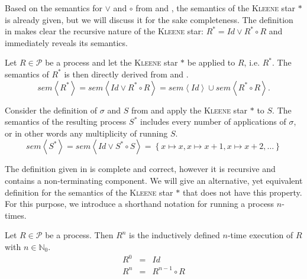 Based on the semantics for $\vee$ and $\circ$ from  and , the semantics of the \textsc{Kleene} star $*$ is already given, but we will discuss it for the sake completeness. The definition in  makes clear the recursive nature of the \textsc{Kleene} star: $R^* = Id \vee R^* \circ R$ and immediately reveals its semantics.
\begin{definition}
\label{def:sem_kleene}
Let $R \in \mathcal{P}$ be a process and let the \textsc{Kleene} star $*$ be applied to $R$, i.e. $R^*$. The semantics of $R^*$ is then directly derived from  and .
  \begin{equation}
    \label{eqn:sem_kleene}
    sem \left\langle R^* \right\rangle = sem \left\langle Id \vee R^* \circ R \right\rangle = sem \left\langle Id \right\rangle \cup sem \left\langle R^* \circ R \right\rangle.
  \end{equation}
  \hfill\qedsymbol
\end{definition}

\begin{example}
Consider the definition of $\sigma$ and $S$ from  and apply the \textsc{Kleene} star $*$ to $S$. The semantics of the resulting process $S^*$ includes every number of applications of $\sigma$, or in other words any multiplicity of running $S$.
  \begin{equation}
    sem \left\langle S^* \right\rangle = sem \left\langle Id \vee S^* \circ S \right\rangle = \left\{ x \mapsto x, x \mapsto x+1, x \mapsto x+2, \ldots \right\}
  \end{equation}
  \hfill\qedsymbol
\end{example}

The definition given in  is complete and correct, however it is recursive and contains a non-terminating component. We will give an alternative, yet equivalent definition for the semantics of the \textsc{Kleene} star $*$ that does not have this property. For this purpose, we introduce a shorthand notation for running a process $n$-times.
\begin{definition}
\label{def:multiple_execution}
Let $R \in \mathcal{P}$ be a process. Then $R^n$ is the inductively defined $n$-time execution of $R$ with $n \in \mathbb{N}_0$.
  \begin{eqnarray}
    \label{eqn:multiple_execution}
    R^0 & = & Id \\
    R^n & = & R^{n-1} \circ R 
  \end{eqnarray}
  \hfill\qedsymbol
\end{definition}

